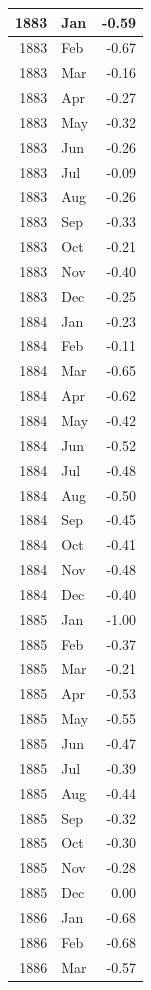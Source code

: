 \documentclass[
]{article}
\begin{document}
\begin{table}[H]
\begin{tabular}[t]{r|l|r}
\hline
1883 & Jan & -0.59\\
\hline
1883 & Feb & -0.67\\
\hline
1883 & Mar & -0.16\\
\hline
1883 & Apr & -0.27\\
\hline
1883 & May & -0.32\\
\hline
1883 & Jun & -0.26\\
\hline
1883 & Jul & -0.09\\
\hline
1883 & Aug & -0.26\\
\hline
1883 & Sep & -0.33\\
\hline
1883 & Oct & -0.21\\
\hline
1883 & Nov & -0.40\\
\hline
1883 & Dec & -0.25\\
\hline
1884 & Jan & -0.23\\
\hline
1884 & Feb & -0.11\\
\hline
1884 & Mar & -0.65\\
\hline
1884 & Apr & -0.62\\
\hline
1884 & May & -0.42\\
\hline
1884 & Jun & -0.52\\
\hline
1884 & Jul & -0.48\\
\hline
1884 & Aug & -0.50\\
\hline
1884 & Sep & -0.45\\
\hline
1884 & Oct & -0.41\\
\hline
1884 & Nov & -0.48\\
\hline
1884 & Dec & -0.40\\
\hline
1885 & Jan & -1.00\\
\hline
1885 & Feb & -0.37\\
\hline
1885 & Mar & -0.21\\
\hline
1885 & Apr & -0.53\\
\hline
1885 & May & -0.55\\
\hline
1885 & Jun & -0.47\\
\hline
1885 & Jul & -0.39\\
\hline
1885 & Aug & -0.44\\
\hline
1885 & Sep & -0.32\\
\hline
1885 & Oct & -0.30\\
\hline
1885 & Nov & -0.28\\
\hline
1885 & Dec & 0.00\\
\hline
1886 & Jan & -0.68\\
\hline
1886 & Feb & -0.68\\
\hline
1886 & Mar & -0.57\\

\end{tabular}
\end{table}
\end{document}
